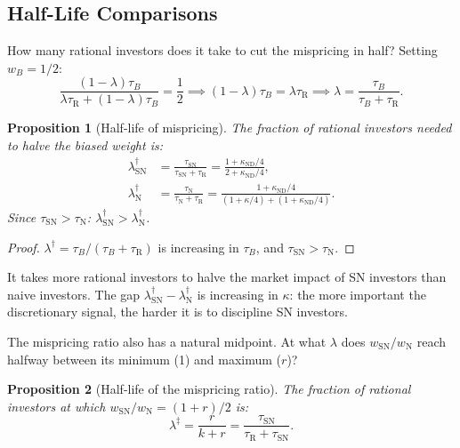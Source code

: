 \documentclass[12pt]{article}
\theoremstyle{plain}
\newtheorem{proposition}{Proposition}
\theoremstyle{definition}
\newcommand{\ND}{\mathrm{ND}}
\newcommand{\R}{\mathrm{R}}
\newcommand{\SN}{\mathrm{SN}}
\newcommand{\N}{\mathrm{N}}
\begin{document}
\subsection{Half-Life Comparisons}
\label{sec:half_life}

How many rational investors does it take to cut the mispricing in half? Setting $w_B = 1/2$:
\[
\frac{(1-\lambda)\tau_B}{\lambda\tau_\R + (1-\lambda)\tau_B} = \frac{1}{2} \implies (1-\lambda)\tau_B = \lambda\tau_\R \implies \lambda = \frac{\tau_B}{\tau_B + \tau_\R}.
\]

\begin{proposition}[Half-life of mispricing]
\label{prop:half_life}
The fraction of rational investors needed to halve the biased weight is:
\begin{align}
\lambda^\dagger_\SN &= \frac{\tau_\SN}{\tau_\SN + \tau_\R} = \frac{1 + \kappa_{\ND}/4}{2 + \kappa_{\ND}/4}, \\
\lambda^\dagger_\N &= \frac{\tau_\N}{\tau_\N + \tau_\R} = \frac{1 + \kappa_{\ND}/4}{(1 + \kappa/4) + (1 + \kappa_{\ND}/4)}.
\end{align}
Since $\tau_\SN > \tau_\N$: $\lambda^\dagger_\SN > \lambda^\dagger_\N$.
\end{proposition}

\begin{proof}
$\lambda^\dagger = \tau_B/(\tau_B + \tau_\R)$ is increasing in $\tau_B$, and $\tau_\SN > \tau_\N$.
\end{proof}

It takes more rational investors to halve the market impact of SN investors than naive investors. The gap $\lambda^\dagger_\SN - \lambda^\dagger_\N$ is increasing in $\kappa$: the more important the discretionary signal, the harder it is to discipline SN investors.

The mispricing ratio also has a natural midpoint. At what $\lambda$ does $w_\SN/w_\N$ reach halfway between its minimum (1) and maximum ($r$)?

\begin{proposition}[Half-life of the mispricing ratio]
\label{prop:half_life_ratio}
The fraction of rational investors at which $w_\SN/w_\N = (1 + r)/2$ is:
\begin{equation}
\lambda^{\ddagger} = \frac{r}{k + r} = \frac{\tau_\SN}{\tau_\R + \tau_\SN}.
\end{equation}
\end{proposition}
\end{document}
